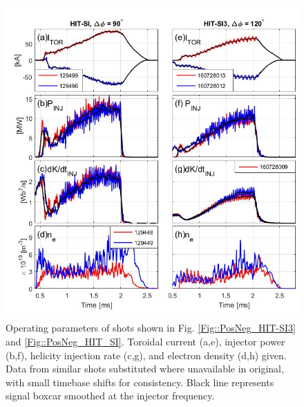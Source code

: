 	\begin{figure}
		\includegraphics[width=6in]{Jscope5}\caption{Operating parameters of shots shown in Fig. \ref{Fig::PosNeg_HIT-SI3} and \ref{Fig::PosNeg_HIT_SI}. Toroidal current (a,e), injector power (b,f), helicity injection rate (c,g), and electron density (d,h) given. Data from similar shots substituted where unavailable in original, with small timebase shifts for consistency. Black line represents signal boxcar smoothed at the injector frequency.}\label{Fig::Jscope}
	\end{figure}
	
